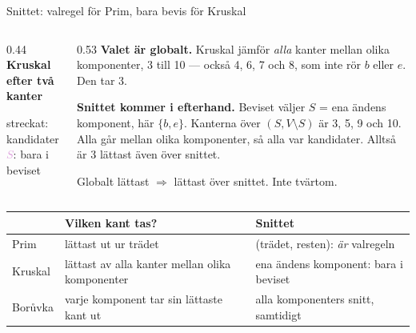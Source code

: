 {\kaninbg
\begin{frame}{\kh Snittet: valregel för Prim, bara bevis för Kruskal}
\begin{columns}[T]
\begin{column}{0.44\textwidth}
\centering
{\small\bfseries\color{kthblue}Kruskal efter två kanter}\par
\par
{\scriptsize\textcolor{kthorange}{streckat}: kandidater\quad \textcolor{plum}{$S$}: bara i beviset}
\end{column}
\begin{column}{0.53\textwidth}
\footnotesize
\textbf{Valet är globalt.} Kruskal jämför \emph{alla} kanter mellan olika komponenter, 3 till 10
— också 4, 6, 7 och 8, som inte rör $b$ eller $e$. Den tar 3.\par\smallskip
\textbf{Snittet kommer i efterhand.} Beviset väljer $S$ = ena ändens komponent, här $\{b,e\}$.
Kanterna över $(S,V\setminus S)$ är 3, 5, 9 och 10. Alla går mellan olika komponenter, så alla var
kandidater. Alltså är 3 lättast även över snittet.\par\smallskip
Globalt lättast $\Rightarrow$ lättast över snittet. Inte tvärtom.
\end{column}
\end{columns}
\vfill
\footnotesize
\renewcommand{\arraystretch}{1.05}
\begin{tabularx}{\textwidth}{@{}p{}p{}X@{}}
\toprule
& \textbf{Vilken kant tas?} & \textbf{Snittet}\\
\midrule
Prim & lättast ut ur trädet & (trädet, resten): \emph{är} valregeln\\
Kruskal & lättast av alla kanter mellan olika komponenter & ena ändens komponent: bara i beviset\\
Borůvka & varje komponent tar sin lättaste kant ut & alla komponenters snitt, samtidigt\\
\bottomrule
\end{tabularx}
\end{frame}}

